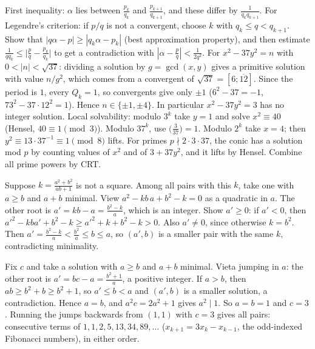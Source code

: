 \documentclass[11pt,a4paper]{article}
\begin{document}

 First inequality: $\alpha$ lies between $\frac{p_k}{q_k}$ and $\frac{p_{k+1}}{q_{k+1}}$, and these differ by $\frac1{q_kq_{k+1}}$. For Legendre's criterion: if $p/q$ is not a convergent, choose $k$ with $q_k\le q<q_{k+1}$. Show that $|q\alpha-p|\ge|q_k\alpha-p_k|$ (best approximation property), and then estimate $\frac1{qq_k}\le\bigl|\frac pq-\frac{p_k}{q_k}\bigr|$ to get a contradiction with $|\alpha-\frac pq|<\frac1{2q^2}$.
 For $x^2-37y^2=n$ with $0<|n|<\sqrt{37}$: dividing a solution by $g=\gcd(x,y)$ gives a primitive solution with value $n/g^2$, which comes from a convergent of $\sqrt{37}=[6;\overline{12}]$. Since the period is $1$, every $Q_k=1$, so convergents give only $\pm1$ ($6^2-37=-1$, $73^2-37\cdot12^2=1$). Hence $n\in\{\pm1,\pm4\}$.
 In particular $x^2-37y^2=3$ has no integer solution. Local solvability: modulo $3^k$ take $y=1$ and solve $x^2\equiv40$ (Hensel, $40\equiv1\pmod3$). Modulo $37^k$, use $\bigl(\frac3{37}\bigr)=1$. Modulo $2^k$ take $x=4$; then $y^2\equiv13\cdot37^{-1}\equiv1\pmod8$ lifts.
 For primes $p\nmid2\cdot3\cdot37$, the conic has a solution mod $p$ by counting values of $x^2$ and of $3+37y^2$, and it lifts by Hensel. Combine all prime powers by CRT.

 Suppose $k=\frac{a^2+b^2}{ab+1}$ is not a square. Among all pairs with this $k$, take one with $a\ge b$ and $a+b$ minimal. View $a^2-kb\,a+b^2-k=0$ as a quadratic in $a$.
 The other root is $a'=kb-a=\frac{b^2-k}a$, which is an integer. Show $a'\ge0$: if $a'<0$, then $a'^2-kba'+b^2-k\ge a'^2+k+b^2-k>0$. Also $a'\ne0$, since otherwise $k=b^2$.
 Then $a'=\frac{b^2-k}a<\frac{b^2}a\le b\le a$, so $(a',b)$ is a smaller pair with the same $k$, contradicting minimality.

 Fix $c$ and take a solution with $a\ge b$ and $a+b$ minimal. Vieta jumping in $a$: the other root is $a'=bc-a=\frac{b^2+1}a$, a positive integer.
 If $a>b$, then $ab\ge b^2+b\ge b^2+1$, so $a'\le b<a$ and $(a',b)$ is a smaller solution, a contradiction. Hence $a=b$, and $a^2c=2a^2+1$ gives $a^2\mid1$. So $a=b=1$ and $c=3$.
 Running the jumps backwards from $(1,1)$ with $c=3$ gives all pairs: consecutive terms of $1,1,2,5,13,34,89,\dots$ ($x_{k+1}=3x_k-x_{k-1}$, the odd-indexed Fibonacci numbers), in either order.
\end{document}

